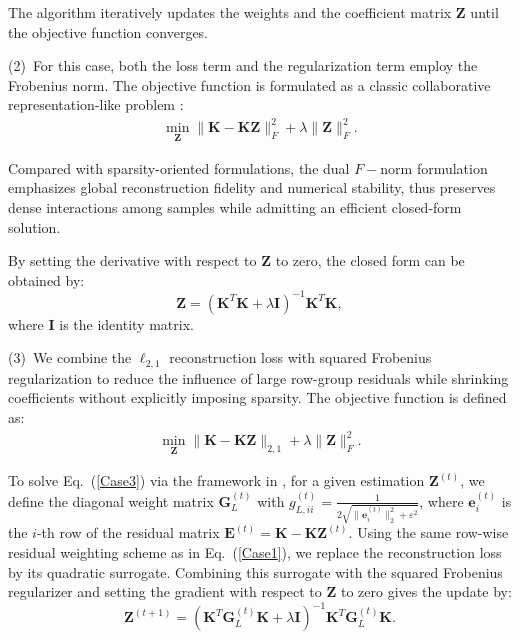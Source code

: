 \documentclass[ASNA,twocolumn]{USG} %
\begin{document}
The algorithm iteratively updates the weights and the coefficient matrix $\boldsymbol{Z}$ until the objective function converges.

(2)~For this case, both the loss term and the regularization term employ the Frobenius norm. The objective function is formulated as a classic collaborative representation-like problem \cite{zhang2011sparse}:
\begin{eqnarray}\label{Case2}
	\min_{\boldsymbol{Z}}\|\boldsymbol{K}-\boldsymbol{K}\boldsymbol{Z}\|_{F}^2+\lambda\|\boldsymbol{Z}\|_{F}^2.
\end{eqnarray}

Compared with sparsity-oriented formulations, the dual $F-$norm formulation emphasizes global reconstruction fidelity and numerical stability, thus preserves dense interactions among samples while admitting an efficient closed-form solution.

By setting the derivative with respect to $\boldsymbol{Z}$ to zero, the closed form can be obtained by:
\begin{equation} \label{Case2_solve}
    \boldsymbol{Z}=\left(\boldsymbol{K}^T \boldsymbol{K}+\lambda \boldsymbol{I}\right)^{-1} \boldsymbol{K}^T \boldsymbol{K},
\end{equation}
where $\boldsymbol{I}$ is the identity matrix.

(3)~We combine the $\ell_{2,1}$ reconstruction loss with squared Frobenius regularization to reduce the influence of large row-group residuals while shrinking coefficients without explicitly imposing sparsity. The objective function is defined as:
\begin{eqnarray}\label{Case3}
	\min_{\boldsymbol{Z}}\|\boldsymbol{K}-\boldsymbol{K}\boldsymbol{Z}\|_{2,1}+\lambda\|\boldsymbol{Z}\|_{F}^2.
\end{eqnarray}

To solve Eq.~(\ref{Case3}) via the framework in \cite{nie2010efficient}, for a given estimation $\boldsymbol{Z}^{(t)}$, we define the diagonal weight matrix $\boldsymbol{G}_L^{(t)}$ with $g_{L,ii}^{(t)} = \frac{1}{2\sqrt{\|\boldsymbol e_i^{(t)}\|_2^2+\varepsilon^2}}$, where $\boldsymbol{e}_i^{(t)}$ is the $i$-th row of the residual matrix $\boldsymbol{E}^{(t)} = \boldsymbol{K} - \boldsymbol{K}\boldsymbol{Z}^{(t)}$. Using the same row-wise residual weighting scheme as in Eq.~(\ref{Case1}), we replace the reconstruction loss by its quadratic surrogate. Combining this surrogate with the squared Frobenius regularizer and setting the gradient with respect to $\boldsymbol{Z}$ to zero gives the update by:
\begin{equation}
    \boldsymbol{Z}^{(t+1)} = \left( \boldsymbol{K}^T \boldsymbol{G}_L^{(t)} \boldsymbol{K} + \lambda \boldsymbol{I} \right)^{-1} \boldsymbol{K}^T \boldsymbol{G}_L^{(t)} \boldsymbol{K}.
\end{equation}
\end{document}

